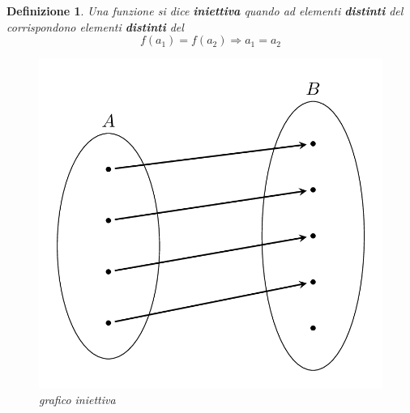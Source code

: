 \documentclass[12pt, a4paper]{article}
\theoremstyle{break}
\newtheorem{defn}{Definizione}
\theoremstyle{lemma}
\theoremstyle{lemma}
\theoremstyle{lemma}
\begin{document}
    \begin{defn} Una funzione si dice \textbf{iniettiva} quando ad elementi \textbf{distinti} del  corrispondono elementi \textbf{distinti} del 
\begin{equation}
  f(a_1) = f(a_2) \Rightarrow a_1 = a_2
\end{equation}

\begin{figure}[ht]
	\center
	\includegraphics[scale=0.135]{iniettiva}
	\caption{grafico iniettiva}
	\label{fig:grafico_iniettiva}
\end{figure}
\end{defn}
\noindent
\end{document}
